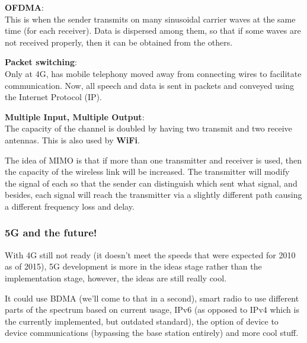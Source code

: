 \begin{description}
  \item \textbf{OFDMA}:\\
    This is when the sender transmits on many sinusoidal carrier waves at the
    same time (for each receiver). Data is dispersed among them, so that if some
    waves are not received properly, then it can be obtained from the others.

   \item \textbf{Packet switching}:\\
     Only at 4G, has mobile telephony moved away from connecting wires to
     facilitate communication. Now, all speech and data is sent in packets and
     conveyed using the Internet Protocol (IP).

  \item \textbf{Multiple Input, Multiple Output}:\\
    The capacity of the channel is doubled by having two transmit and two
    receive antennas. This is also used by \textbf{WiFi}.

    The idea of MIMO is that if more than one transmitter and receiver is used,
    then the capacity of the wireless link will be increased. The transmitter
    will modify the signal of each so that the sender can distinguish which sent
    what signal, and besides, each signal will reach the transmitter via a
    slightly different path causing a different frequency loss and delay.
\end{description}

\subsubsection{5G and the future!}

With 4G still not ready (it doesn't meet the speeds that were expected for 2010
as of 2015), 5G development is more in the ideas stage rather than the
implementation stage, however, the ideas are still really cool.

It could use BDMA (we'll come to that in a second), smart radio to use different
parts of the spectrum based on current usage, IPv6 (as opposed to IPv4 which is
the currently implemented, but outdated standard), the option of device to
device communications (bypassing the base station entirely) and more cool stuff.


